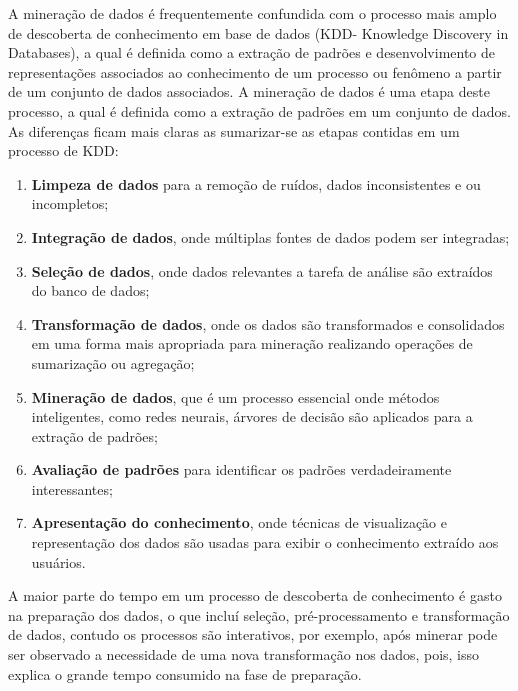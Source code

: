 A mineração de dados é frequentemente confundida com o processo mais amplo de descoberta de conhecimento em base de dados (KDD- Knowledge Discovery in Databases), a qual é definida como a extração de padrões e desenvolvimento de representações associados ao conhecimento de um processo ou fenômeno a partir de um conjunto de dados associados. A mineração de dados é uma etapa deste processo, a qual é definida como a extração de padrões em um conjunto de dados. As diferenças ficam mais claras as sumarizar-se as etapas contidas em um processo de KDD:

\begin{enumerate}
\item {\bf Limpeza de dados} para a remoção de ruídos, dados inconsistentes e ou incompletos;
\item {\bf Integração de dados}, onde múltiplas fontes de dados podem ser integradas;
\item {\bf Seleção de dados}, onde dados relevantes a tarefa de análise são extraídos do banco de dados;
\item {\bf Transformação de dados}, onde os dados são transformados e consolidados em uma forma mais apropriada para mineração realizando operações de sumarização ou agregação;
\item {\bf Mineração de dados}, que é um processo essencial onde métodos inteligentes, como redes neurais, árvores de decisão são aplicados para a extração de padrões;
\item {\bf Avaliação de padrões} para identificar os padrões verdadeiramente interessantes;
\item {\bf Apresentação do conhecimento}, onde técnicas de visualização e representação dos dados são usadas para exibir o conhecimento extraído aos usuários.
\end{enumerate} 

A maior parte do tempo em um processo de descoberta de conhecimento é gasto na preparação dos dados, o que incluí seleção, pré-processamento e transformação de dados, contudo os processos são interativos, por exemplo, após minerar pode ser observado a necessidade de uma nova transformação nos dados, pois, isso explica o grande tempo consumido na fase de preparação.

